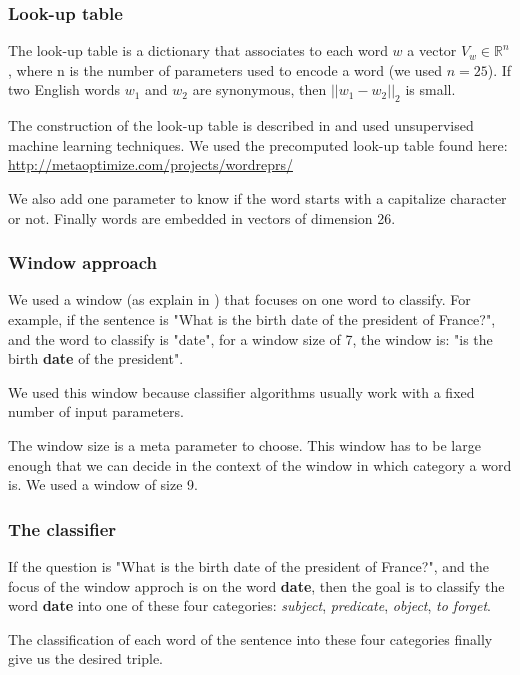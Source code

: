 \subsubsection{Look-up table}

The look-up table is a dictionary that associates to each word $w$ a vector $V_w \in \mathbb{R}^n$, where n is the number of parameters used to encode a word (we used $n=25$).
If two English words $w_1$ and $w_2$ are synonymous, then $||w_1-w_2||_2$ is small.

The construction of the look-up table is described in \cite{collobert} and used unsupervised machine learning techniques.
We used the precomputed look-up table found here: \url{http://metaoptimize.com/projects/wordreprs/}

We also add one parameter to know if the word starts with a capitalize character or not. Finally words are embedded in vectors of dimension 26. 

\subsubsection{Window approach}

We used a window (as explain in \cite{collobert}) that focuses on one word to classify. For example, if the sentence is "What is the birth date of the president of France?", and the word to classify is "date", for a window size of 7, the window is: "is the birth \textbf{date} of the president".


We used this window because classifier algorithms usually work with a fixed number of input parameters. 

The window size is a meta parameter to choose. This window has to be large enough that we can decide in the context of the window in which category a word is. We used a window of size 9.

\subsubsection{The classifier}

If the question is "What is the birth date of the president of France?", and the focus of the window approch is on the word \textbf{date}, then the goal is to classify the word \textbf{date} into one of these four categories: \textit{subject}, \textit{predicate}, \textit{object}, \textit{to forget}.

The classification of each word of the sentence into these four categories finally give us the desired triple.

